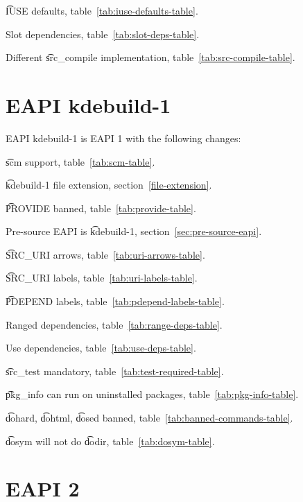 \begin{compactitem}
\item \t{IUSE} defaults, table~\ref{tab:iuse-defaults-table}.
\item Slot dependencies, table~\ref{tab:slot-deps-table}.
\item Different \t{src\_compile} implementation, table~\ref{tab:src-compile-table}.
\end{compactitem}

\IFKDEBUILDELSE
{
    \section*{EAPI kdebuild-1}

    EAPI kdebuild-1 is EAPI 1 with the following changes:

    \begin{compactitem}
    \item \t{scm} support, table~\ref{tab:scm-table}.
    \item \t{kdebuild-1} file extension, section~\ref{file-extension}.
    \item \t{PROVIDE} banned, table~\ref{tab:provide-table}.
    \item Pre-source EAPI is \t{kdebuild-1}, section~\ref{sec:pre-source-eapi}.
    \item \t{SRC\_URI} arrows, table~\ref{tab:uri-arrows-table}.
    \item \t{SRC\_URI} labels, table~\ref{tab:uri-labels-table}.
    \item \t{PDEPEND} labels, table~\ref{tab:pdepend-labels-table}.
    \item Ranged dependencies, table~\ref{tab:range-deps-table}.
    \item Use dependencies, table~\ref{tab:use-deps-table}.
    \item \t{src\_test} mandatory, table~\ref{tab:test-required-table}.
    \item \t{pkg\_info} can run on uninstalled packages, table~\ref{tab:pkg-info-table}.
    \item \t{dohard}, \t{dohtml}, \t{dosed} banned, table~\ref{tab:banned-commands-table}.
    \item \t{dosym} will not do \t{dodir}, table~\ref{tab:dosym-table}.
    \end{compactitem}
}{
}

\section*{EAPI 2}

